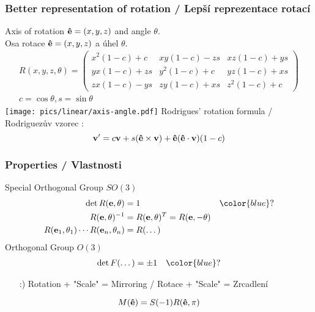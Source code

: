\begin{frame}\frametitle{Better representation of rotation / Lepší reprezentace rotací}
  Axis of rotation $\mathbf{\hat{e}} = (x,y,z)$ and angle $\theta$.\\
  Osa rotace $\mathbf{\hat{e}} = (x,y,z)$ a úhel $\theta$.
  \begin{align*}
      R(x,y,z, \theta) = \begin{pmatrix}
          x^2(1-c) + c & xy(1-c) - zs & xz(1-c) + ys \\
          yx(1-c) + zs & y^2(1-c) + c & yz(1-c) + xs \\
          zx(1-c) - ys & zy(1-c) + xs & z^2(1-c) + c \end{pmatrix} \\
      c = \cos\theta, s = \sin\theta
  \end{align*}
  \vfill
  \texttt{[image: pics/linear/axis-angle.pdf]}
  \vfill
  Rodrigues' rotation formula / Rodriguezův vzorec :
  \begin{equation*}
      \mathbf{v}' = c\mathbf{v} + s(\mathbf{\hat{e}}\times\mathbf{v}) + \mathbf{\hat{e}}(\mathbf{\hat{e}}\cdot\mathbf{v})(1-c)
  \end{equation*}
\end{frame}

\begin{frame}\frametitle{Properties / Vlastnosti}
  Special Orthogonal Group $SO(3)$
  \begin{align*}
      \det R(\V{e}, \theta) &= 1 & {\color{blue}?} \\
      R(\V{e}, \theta)^{-1} &= R(\V{e}, \theta)^T = R(\V{e}, -\theta) \\
      R(\V{e}_1,\theta_1)\dotsm R(\V{e}_n,\theta_n) &= R(\dotso)
  \end{align*}
  \pause\vfill
  Orthogonal Group $O(3)$
  \begin{align*}
      \det F(\dotso) &= \pm1 & {\color{blue}?}
  \end{align*}
  \pause\vfill
  \begin{itemize}
      \item[\color{green}:)] Rotation + "Scale" = Mirroring / Rotace + "Scale" = Zrcadlení
  \end{itemize}
  \begin{equation*}
      M(\mathbf{\hat{e}}) = S(-1)R(\mathbf{\hat{e}}, \pi)
  \end{equation*}
\end{frame}

